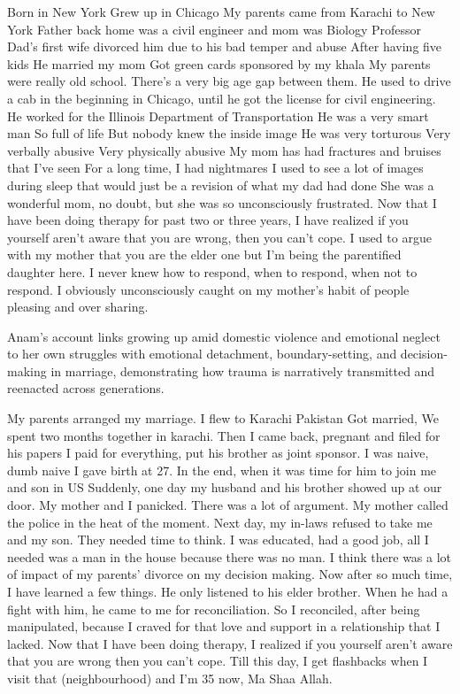 \begin{FoundPoem}
Born in New York 
Grew up in Chicago 
My parents came from Karachi to New York 
Father back home was a civil engineer and mom was Biology Professor 
Dad’s first wife divorced him due to his bad temper and abuse 
After having five kids 
He married my mom 
Got green cards sponsored by my khala  
My parents were really old school. 
There’s a very big age gap between them. 
He used to drive a cab in the beginning in Chicago, 
until he got the license for civil engineering. 
He worked for the Illinois Department of Transportation 
He was a very smart man 
So full of life 
But nobody knew the inside image 
He was very torturous 
Very verbally abusive 
Very physically abusive 
My mom has had  fractures and bruises that I’ve seen 
For a long time, I had nightmares 
I used to see a lot of images during sleep 
that would just be a revision of what my dad had done 
She was a wonderful mom, no doubt,
but she was so unconsciously frustrated.
Now that I have been doing therapy
for past two or three years,
I have realized
if you yourself aren’t aware that you are wrong,
then you can’t cope.
I used to argue with my mother
that you are the elder one
but I’m being the parentified daughter here.
I never knew how to respond,
when to respond,
when not to respond.
I obviously unconsciously caught on
my mother’s habit of people pleasing
and over sharing.
\end{FoundPoem}


Anam's account links growing up amid domestic violence and emotional neglect to her own struggles with emotional detachment, boundary-setting, and decision-making in marriage, demonstrating how trauma is narratively transmitted and reenacted across generations.

\begin{FoundPoem}
My parents arranged my marriage.
I flew to Karachi Pakistan
Got married, 
We spent two months together in karachi.
Then I came back, pregnant and 
filed for his papers 
I paid for everything,
put his brother as joint sponsor.
I was naive,
dumb naive
I gave birth at 27.
In the end, when it was time for him to join me and son in US
Suddenly, one day
my husband and his brother
 showed up at our door.
My mother and I panicked.
There was a lot of argument.
My mother called the police
in the heat of the moment. 
Next day, my in-laws refused to take me and my son.
They needed time to think.
 I was educated,
had a good job,
all I needed was a man in the house
because there was no man.
I think there was a lot of impact of my parents’ divorce
on my decision making.
Now after so much time,
I have learned a few things.
He only listened to his elder brother.
When he had a fight with him,
he came to me for reconciliation.
So I reconciled,
after being manipulated,
because I craved for that love and support
in a relationship that I lacked. 
Now that I have been doing therapy,
I realized if you yourself aren’t aware
that you are wrong
then you can’t cope.
Till this day,
I get flashbacks
when I visit that (neighbourhood)
and I’m 35 now, Ma Shaa Allah.
\end{FoundPoem}


